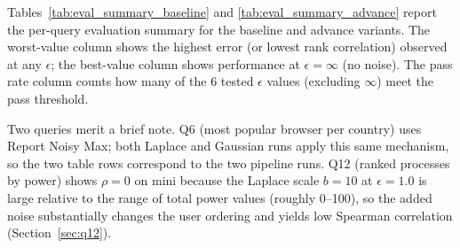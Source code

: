 \documentclass[12pt,letterpaper]{article}
\begin{document}
Tables~\ref{tab:eval_summary_baseline} and \ref{tab:eval_summary_advance} report the per-query evaluation summary for the baseline and advance variants. The worst-value column shows the highest error (or lowest rank correlation) observed at any $\epsilon$; the best-value column shows performance at $\epsilon = \infty$ (no noise). The pass rate column counts how many of the 6 tested $\epsilon$ values (excluding $\infty$) meet the pass threshold.

Two queries merit a brief note. Q6 (most popular browser per country) uses Report Noisy Max; both Laplace and Gaussian runs apply this same mechanism, so the two table rows correspond to the two pipeline runs. Q12 (ranked processes by power) shows $\rho = 0$ on mini because the Laplace scale $b = 10$ at $\epsilon = 1.0$ is large relative to the range of total power values (roughly 0--100), so the added noise substantially changes the user ordering and yields low Spearman correlation (Section~\ref{sec:q12}).
\end{document}
